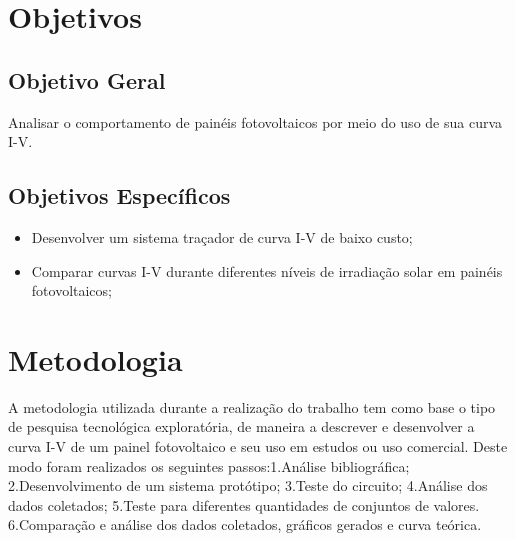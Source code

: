 \section{Objetivos}

\subsection{Objetivo Geral}

Analisar o comportamento de painéis fotovoltaicos por meio do uso de sua curva I-V.

\subsection{Objetivos Específicos}
\begin{itemize}
	\item Desenvolver um sistema traçador de curva I-V de baixo custo;
	\item Comparar curvas I-V durante diferentes níveis de irradiação solar em painéis fotovoltaicos;%

\end{itemize}

\section{Metodologia}

A metodologia utilizada durante a realização do trabalho tem como base o tipo de pesquisa tecnológica exploratória, de maneira a descrever e desenvolver a curva I-V de um painel fotovoltaico e seu uso em estudos ou uso comercial. Deste modo foram realizados os seguintes passos:1.Análise bibliográfica; 2.Desenvolvimento de um sistema protótipo; 3.Teste do circuito; 4.Análise dos dados coletados; 5.Teste para diferentes quantidades de conjuntos de valores. 6.Comparação e análise dos dados coletados, gráficos gerados e curva teórica.
